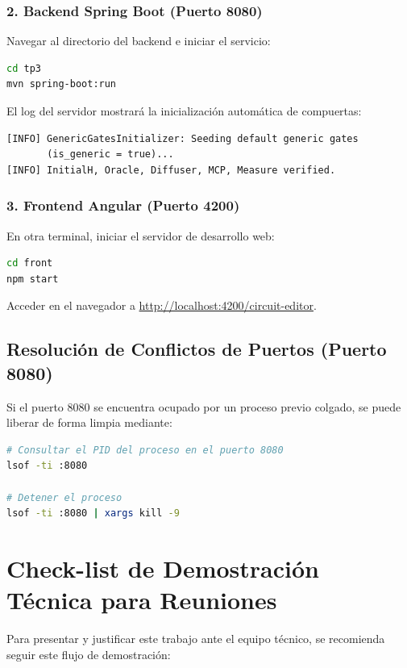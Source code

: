 \documentclass[11pt,a4paper]{article}
\begin{document}
\subsubsection{2. Backend Spring Boot (Puerto 8080)}
Navegar al directorio del backend e iniciar el servicio:
\begin{lstlisting}[language=bash]
cd tp3
mvn spring-boot:run
\end{lstlisting}
El log del servidor mostrará la inicialización automática de compuertas:
\begin{verbatim}
[INFO] GenericGatesInitializer: Seeding default generic gates
       (is_generic = true)...
[INFO] InitialH, Oracle, Diffuser, MCP, Measure verified.
\end{verbatim}

\subsubsection{3. Frontend Angular (Puerto 4200)}
En otra terminal, iniciar el servidor de desarrollo web:
\begin{lstlisting}[language=bash]
cd front
npm start
\end{lstlisting}
Acceder en el navegador a \url{http://localhost:4200/circuit-editor}.

\subsection{Resolución de Conflictos de Puertos (Puerto 8080)}
Si el puerto 8080 se encuentra ocupado por un proceso previo colgado, se puede liberar de forma limpia mediante:
\begin{lstlisting}[language=bash]
# Consultar el PID del proceso en el puerto 8080
lsof -ti :8080

# Detener el proceso
lsof -ti :8080 | xargs kill -9
\end{lstlisting}

\section{Check-list de Demostración Técnica para Reuniones}

Para presentar y justificar este trabajo ante el equipo técnico, se recomienda seguir este flujo de demostración:
\end{document}
